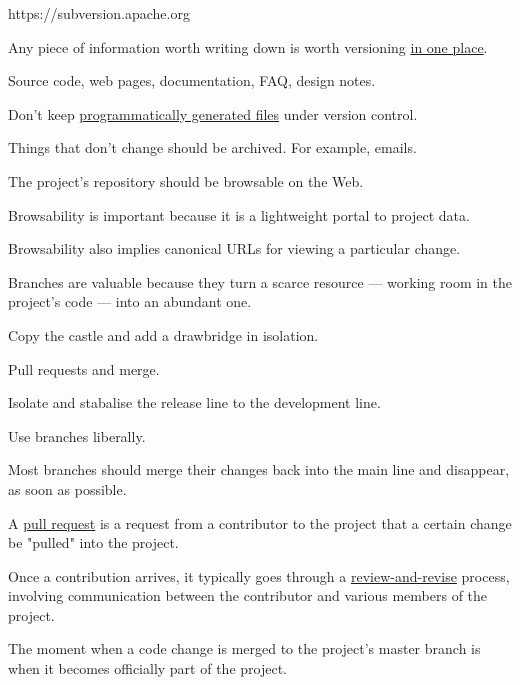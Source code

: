 \documentclass[landscape,30pt]{foils}
\begin{document}
https://subversion.apache.org



Any piece of information worth writing down is worth versioning \underline{in one place}.

Source code, web pages, documentation, FAQ, design notes.

Don't keep \underline{programmatically generated files} under version control. 

Things that don't change should be archived. For example, emails.



The project's repository should be browsable on the Web. 

Browsability is important because it is a lightweight portal to project data.

Browsability also implies canonical URLs for viewing a particular change.


Branches are valuable because they turn a scarce resource — working room in the project's code — into an abundant one. 

Copy the castle and add a drawbridge in isolation.

Pull requests and merge.

Isolate and stabalise the release line to the development line.

Use branches liberally.

Most branches should merge their changes back into the main line and disappear, as soon as possible.


A \underline{pull request} is a request from a contributor to the
project that a certain change be "pulled" into the project.

Once a contribution arrives, it typically goes through a
\underline{review-and-revise} process, involving communication between
the contributor and various members of the project.

The moment when a code change is merged to the project's master branch
is when it becomes officially part of the project.
\end{document}
